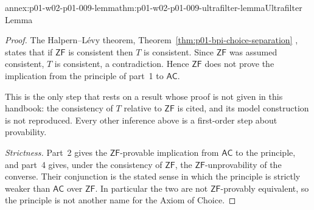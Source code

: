 \begin{annexitem}{annex:p01-w02-p01-009-lemma}{thm:p01-w02-p01-009-ultrafilter-lemma}{Ultrafilter Lemma}
\begin{proof}
The Halpern--L\'evy theorem, Theorem~\ref{thm:p01-bpi-choice-separation}
\cite{HalpernLevy1971}, states that if \(\mathsf{ZF}\) is consistent then
\(T\) is consistent. Since \(\mathsf{ZF}\) was assumed consistent, \(T\) is
consistent, a contradiction. Hence \(\mathsf{ZF}\) does not prove the
implication from the principle of part~1 to \(\mathsf{AC}\).

This is the only step that rests on a result whose proof is not given in this
handbook: the consistency of \(T\) relative to \(\mathsf{ZF}\) is cited, and
its model construction is not reproduced. Every other inference above is a
first-order step about provability.

\emph{Strictness.} Part~2 gives the \(\mathsf{ZF}\)-provable implication from
\(\mathsf{AC}\) to the principle, and part~4 gives, under the consistency of
\(\mathsf{ZF}\), the \(\mathsf{ZF}\)-unprovability of the converse. Their
conjunction is the stated sense in which the principle is strictly weaker
than \(\mathsf{AC}\) over \(\mathsf{ZF}\). In particular the two are not
\(\mathsf{ZF}\)-provably equivalent, so the principle is not another name for
the Axiom of Choice.
\end{proof}
\end{annexitem}


